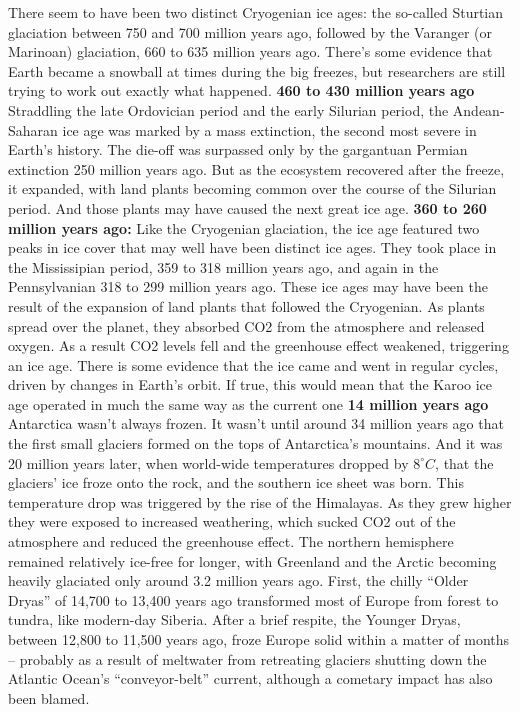     			\ddd There seem to have been two distinct Cryogenian ice ages: the so-called Sturtian glaciation between 750 and 700 million years ago, followed by the Varanger (or Marinoan) glaciation, 660 to 635 million years ago. There’s some evidence that Earth became a snowball at times during the big freezes, but researchers are still trying to work out exactly what happened.
 				\textbf{460 to 430 million years ago}
 				\ddd Straddling the late Ordovician period and the early Silurian period, the Andean-Saharan ice age was marked by a mass extinction, the second most severe in Earth’s history.
 				\ddd The die-off was surpassed only by the gargantuan Permian extinction 250 million years ago. But as the ecosystem recovered after the freeze, it expanded, with land plants becoming common over the course of the Silurian period. And those plants may have caused the next great ice age.
			\textbf{360 to 260 million years ago: }
			\ddd Like the Cryogenian glaciation, the  ice age featured two peaks in ice cover that may well have been distinct ice ages. They took place in the Mississipian period, 359 to 318 million years ago, and again in the Pennsylvanian 318 to 299 million years ago.
			\ddd These ice ages may have been the result of the expansion of land plants that followed the Cryogenian. As plants spread over the planet, they absorbed CO2 from the atmosphere and released oxygen. As a result CO2 levels fell and the greenhouse effect weakened, triggering an ice age.
			\ddd There is some evidence that the ice came and went in regular cycles, driven by changes in Earth’s orbit. If true, this would mean that the Karoo ice age operated in much the same way as the current one
			\textbf{14 million years ago}
			\ddd Antarctica wasn’t always frozen. It wasn’t until around 34 million years ago that the first small glaciers formed on the tops of Antarctica’s mountains. And it was 20 million years later, when world-wide temperatures dropped by $ 8^\circ C $, that the glaciers’ ice froze onto the rock, and the southern ice sheet was born.
			\ddd This temperature drop was triggered by the rise of the Himalayas. As they grew higher they were exposed to increased weathering, which sucked CO2 out of the atmosphere and reduced the greenhouse effect.
			\ddd The northern hemisphere remained relatively ice-free for longer, with Greenland and the Arctic becoming heavily glaciated only around 3.2 million years ago.
		\ddd First, the chilly “Older Dryas” of 14,700 to 13,400 years ago transformed most of Europe from forest to tundra, like modern-day Siberia. After a brief respite, the Younger Dryas, between 12,800 to 11,500 years ago, froze Europe solid within a matter of months – probably as a result of meltwater from retreating glaciers shutting down the Atlantic Ocean’s “conveyor-belt” current, although a cometary impact has also been blamed.
